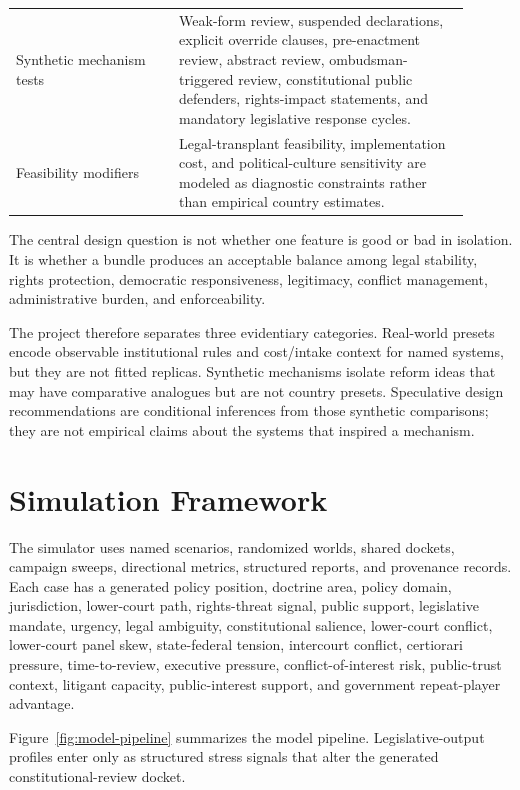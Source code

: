 \documentclass[
  journal=small,
  manuscript=research-article,
  year=2026
]{cup-journal}
\begin{document}
\begin{longtable}{p{0.32\linewidth}p{0.58\linewidth}}
Synthetic mechanism tests & Weak-form review, suspended declarations, explicit override clauses, pre-enactment review, abstract review, ombudsman-triggered review, constitutional public defenders, rights-impact statements, and mandatory legislative response cycles. \\
Feasibility modifiers & Legal-transplant feasibility, implementation cost, and political-culture sensitivity are modeled as diagnostic constraints rather than empirical country estimates. \\
\bottomrule
\end{longtable}

The central design question is not whether one feature is good or bad in isolation. It is whether a bundle produces an acceptable balance among legal stability, rights protection, democratic responsiveness, legitimacy, conflict management, administrative burden, and enforceability.

The project therefore separates three evidentiary categories. Real-world presets encode observable institutional rules and cost/intake context for named systems, but they are not fitted replicas. Synthetic mechanisms isolate reform ideas that may have comparative analogues but are not country presets. Speculative design recommendations are conditional inferences from those synthetic comparisons; they are not empirical claims about the systems that inspired a mechanism.

\section{Simulation Framework}
\label{sec:framework}

The simulator uses named scenarios, randomized worlds, shared dockets, campaign sweeps, directional metrics, structured reports, and provenance records. Each case has a generated policy position, doctrine area, policy domain, jurisdiction, lower-court path, rights-threat signal, public support, legislative mandate, urgency, legal ambiguity, constitutional salience, lower-court conflict, lower-court panel skew, state-federal tension, intercourt conflict, certiorari pressure, time-to-review, executive pressure, conflict-of-interest risk, public-trust context, litigant capacity, public-interest support, and government repeat-player advantage.

Figure~\ref{fig:model-pipeline} summarizes the model pipeline. Legislative-output profiles enter only as structured stress signals that alter the generated constitutional-review docket.
\end{document}
